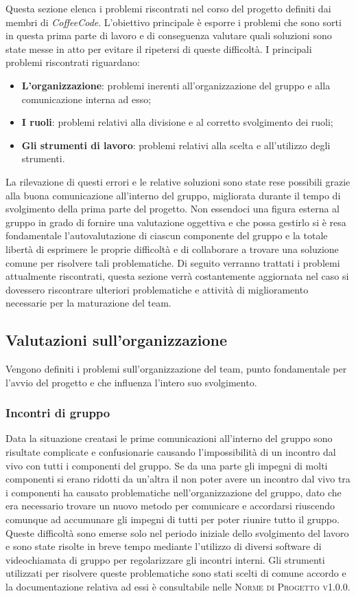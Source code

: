 \documentclass[../piano-di-qualifica.tex]{subfiles}
\begin{document}
Questa sezione elenca i problemi riscontrati nel corso del progetto definiti dai membri di \emph{CoffeeCode}.
L'obiettivo principale è esporre i problemi che sono sorti in questa prima parte di lavoro e di conseguenza valutare quali soluzioni sono state messe in atto per evitare il ripetersi di queste difficoltà.
I principali problemi riscontrati riguardano:
\begin{itemize}
    \item \textbf{L'organizzazione}: problemi inerenti all'organizzazione del gruppo e alla comunicazione interna ad esso;
    \item \textbf{I ruoli}: problemi relativi alla divisione e al corretto svolgimento dei ruoli;
    \item \textbf{Gli strumenti di lavoro}: problemi relativi alla scelta e all'utilizzo degli strumenti.
\end{itemize}
La rilevazione di questi errori e le relative soluzioni sono state rese possibili grazie alla buona comunicazione all'interno del gruppo, migliorata durante il tempo di svolgimento della prima parte del progetto.
Non essendoci una figura esterna al gruppo in grado di fornire una valutazione oggettiva e che possa gestirlo si è resa fondamentale l'autovalutazione di ciascun componente del gruppo e la totale libertà di esprimere le proprie difficoltà e di collaborare a trovare una soluzione comune per risolvere tali problematiche.
Di seguito verranno trattati i problemi attualmente riscontrati, questa sezione verrà costantemente aggiornata nel caso si dovessero riscontrare ulteriori problematiche e attività di miglioramento necessarie per la maturazione del team.

\subsection{Valutazioni sull’organizzazione}
\label{sub:valutazioni_organizzazione}
Vengono definiti i problemi sull'organizzazione del team, punto fondamentale per l'avvio del progetto e che influenza l'intero suo svolgimento.

\subsubsection{Incontri di gruppo}
\label{sub:incontri_di_gruppo}
Data la situazione creatasi le prime comunicazioni all'interno del gruppo sono risultate complicate e confusionarie causando l'impossibilità di un incontro dal vivo con tutti i componenti del gruppo.
Se da una parte gli impegni di molti componenti si erano ridotti da un'altra il non poter avere un incontro dal vivo tra i componenti ha causato problematiche nell'organizzazione del gruppo, dato che era necessario trovare un nuovo metodo per comunicare e accordarsi riuscendo comunque ad accumunare gli impegni di tutti per poter riunire tutto il gruppo.
Queste difficoltà sono emerse solo nel periodo iniziale dello svolgimento del lavoro e sono state risolte in breve tempo mediante l'utilizzo di diversi software di videochiamata di gruppo per regolarizzare gli incontri interni.
Gli strumenti utilizzati per risolvere queste problematiche sono stati scelti di comune accordo e la documentazione relativa ad essi è consultabile nelle \textsc{Norme di Progetto v1.0.0}.
\end{document}
